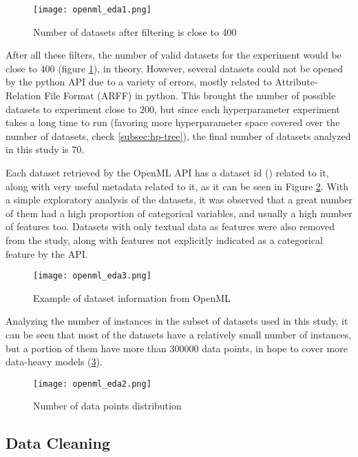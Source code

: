\begin{figure}[!h]
    \centering
    \texttt{[image: openml\_eda1.png]} 
    \caption{Number of datasets after filtering is close to 400}
    \label{fig:openml-eda1}
\end{figure}

After all these filters, the number of valid datasets for the experiment would be close to 400 (figure \ref{fig:openml-eda1}), in theory. However, several datasets could not be opened by the python API due to a variety of errors, mostly related to Attribute-Relation File Format (ARFF) in python. This brought the number of possible datasets to experiment close to $200$, but since each hyperparameter experiment takes a long time to run (favoring more hyperparameter space covered over the number of datasets, check \ref{subsec:hp-tree}), the final number of datasets analyzed in this study is 70.


Each dataset retrieved by the OpenML API has a dataset id () related to it, along with very useful metadata related to it, as it can be seen in Figure \ref{fig:openml-eda3}. With a simple exploratory analysis of the datasets, it was observed that a great number of them had a high proportion of categorical variables, and usually a high number of features too. Datasets with only textual data as features were also removed from the study, along with features not explicitly indicated as a categorical feature by the API.

\begin{figure}[H]
    \centering
    \texttt{[image: openml\_eda3.png]} 
    \caption{Example of dataset information from OpenML}
    \label{fig:openml-eda3}
\end{figure}

Analyzing the number of instances in the subset of datasets used in this study, it can be seen that most of the datasets have a relatively small number of instances, but a portion of them have more than $300000$ data points, in hope to cover more data-heavy models (\ref{fig:openml-eda2}).

\begin{figure}[H]
    \centering
    \texttt{[image: openml\_eda2.png]} 
    \caption{Number of data points distribution}
    \label{fig:openml-eda2}
\end{figure}

\newpage

\subsection{Data Cleaning}

